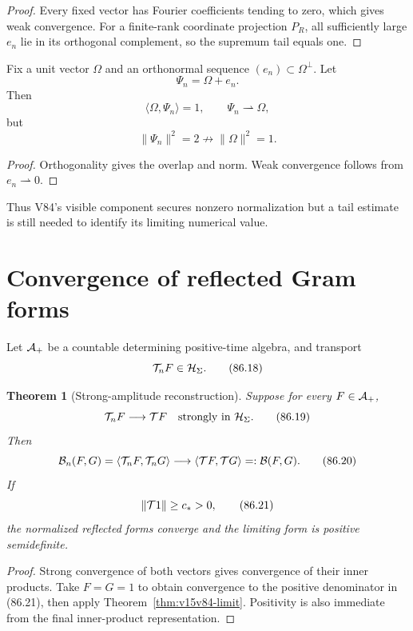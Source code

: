 \documentclass[11pt]{article}
\newtheorem{theorem}{Theorem}[section]
\theoremstyle{remark}
\begin{document}
\begin{proof}
Every fixed vector has Fourier coefficients tending to zero, which
gives weak convergence.  For a finite-rank coordinate projection
\(P_R\), all sufficiently large \(e_n\) lie in its orthogonal
complement, so the supremum tail equals one.
\end{proof}

\begin{counterexample}
\label{cnt:v15v86-visible-escape}
Fix a unit vector \(\Omega\) and an orthonormal sequence
\((e_n)\subset\Omega^\perp\).  Let
\[
 \Psi_n=\Omega+e_n.                                   \tag{86.16}
\]
Then
\[
 \langle\Omega,\Psi_n\rangle=1,\qquad
 \Psi_n\rightharpoonup\Omega,
\]
but
\[
 \|\Psi_n\|^2=2\not\longrightarrow\|\Omega\|^2=1.      \tag{86.17}
\]
\end{counterexample}

\begin{proof}
Orthogonality gives the overlap and norm.  Weak convergence follows
from \(e_n\rightharpoonup0\).
\end{proof}

Thus V84's visible component secures nonzero normalization but a
tail estimate is still needed to identify its limiting numerical
value.

\section{Convergence of reflected Gram forms}

Let \({\cal A}_+\) be a countable determining positive-time
algebra, and transport
\[
 {\cal T}_nF\in{\cal H}_\Sigma.                        \tag{86.18}
\]

\begin{theorem}[Strong-amplitude reconstruction]
\label{thm:v15v86-gram}
Suppose for every \(F\in{\cal A}_+\),
\[
 {\cal T}_nF\longrightarrow{\cal T}F
 \quad\hbox{strongly in }{\cal H}_\Sigma.              \tag{86.19}
\]
Then
\[
 {\cal B}_n(F,G)
 =
 \langle{\cal T}_nF,{\cal T}_nG\rangle
 \longrightarrow
 \langle{\cal T}F,{\cal T}G\rangle
 =:{\cal B}(F,G).                                     \tag{86.20}
\]
If
\[
 \|{\cal T}1\|\geq c_*>0,                             \tag{86.21}
\]
the normalized reflected forms converge and the limiting form is
positive semidefinite.
\end{theorem}

\begin{proof}
Strong convergence of both vectors gives convergence of their
inner products.  Take \(F=G=1\) to obtain convergence to the
positive denominator in (86.21), then apply
Theorem~\ref{thm:v15v84-limit}.  Positivity is also immediate from
the final inner-product representation.
\end{proof}
\end{document}
